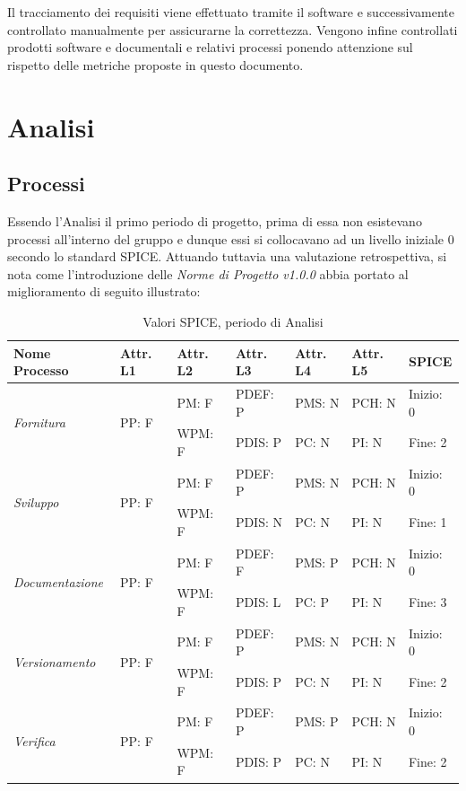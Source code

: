 \documentclass[openany,12pt,a4paper]{report}
\begin{document}
\noindent Il tracciamento dei requisiti viene effettuato tramite il software  e successivamente controllato manualmente per assicurarne la correttezza.
Vengono infine controllati prodotti software e documentali e relativi processi ponendo attenzione sul rispetto delle metriche proposte in questo documento.


\section{Analisi}

\subsection{Processi}

Essendo l'Analisi il primo periodo di progetto, prima di essa non esistevano processi all'interno del gruppo e dunque essi si collocavano ad un livello iniziale 0 secondo lo standard SPICE. Attuando tuttavia una valutazione retrospettiva, si nota come l'introduzione delle \textit{Norme di Progetto v1.0.0} abbia portato al miglioramento di seguito illustrato:

\begin{table}[h]
	\begin{center}
		\setlength\LTleft{-22mm}
		\begin{longtable}{|p{35mm}|p{20mm}|p{20mm}|p{20mm}|p{20mm}|p{20mm}|p{20mm}|}
			\hline
			\textbf{Nome Processo} & \textbf{Attr. L1} & \textbf{Attr. L2} & \textbf{Attr. L3} & \textbf{Attr. L4} & \textbf{Attr. L5} & \textbf{SPICE}\\
			\hline
			\multirow{2}{*}{\textit{Fornitura}} & \multirow{2}{*}{PP: F} & PM: F & PDEF: P & PMS: N & PCH: N & Inizio: 0\\  
			\cline{3-7}
			&          & WPM: F & PDIS: P & PC: N & PI: N & Fine: 2 \\ 
			\hline
			\multirow{2}{*}{\textit{Sviluppo}} & \multirow{2}{*}{PP: F} & PM: F & PDEF: P & PMS: N & PCH: N & Inizio: 0\\  \cline{3-7}
			&          & WPM: F & PDIS: N & PC: N & PI: N & Fine: 1\\
			\hline\multirow{2}{*}{\textit{Documentazione}} & \multirow{2}{*}{PP: F} & PM: F & PDEF: F & PMS: P & PCH: N & Inizio: 0\\  \cline{3-7}
			&          & WPM: F & PDIS: L & PC: P & PI: N & Fine: 3\\ 
			\hline\multirow{2}{*}{\textit{Versionamento}} & \multirow{2}{*}{PP: F} & PM: F & PDEF: P & PMS: N & PCH: N & Inizio: 0\\  \cline{3-7}
			&          & WPM: F & PDIS: P & PC: N & PI: N & Fine: 2\\ 
			\hline\multirow{2}{*}{\textit{Verifica}} & \multirow{2}{*}{PP: F} & PM: F & PDEF: P & PMS: P & PCH: N & Inizio: 0\\  \cline{3-7}
			&          & WPM: F & PDIS: P & PC: N & PI: N & Fine: 2\\ 
			\hline       
		\end{longtable}
	\end{center}
	\caption{Valori SPICE, periodo di Analisi} 
\end{table}
\end{document}
